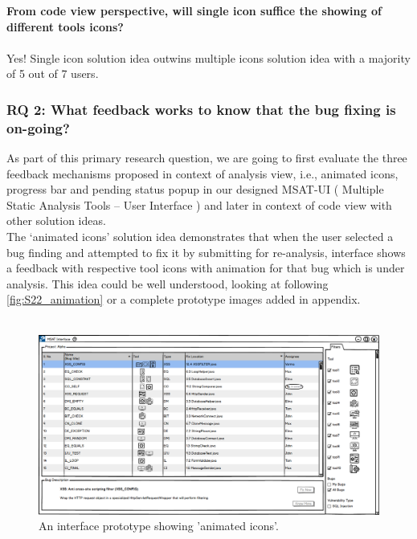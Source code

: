 \begin{myboxi}{{\textbf{From code view perspective, will single icon suffice the showing of different tools icons?}}}
\\ \\	Yes! Single icon solution idea outwins multiple icons solution idea with a majority of 5 out of 7 users. 
\end{myboxi}


\subsubsection{RQ 2: What feedback works to know that the bug fixing is on-going?}

As part of this primary research question, we are going to first evaluate the three feedback mechanisms proposed in context of analysis view, i.e., animated icons, progress bar and pending status popup in our designed MSAT-UI ( Multiple Static Analysis Tools – User Interface ) and later in context of code view with other solution ideas. \\

The ‘animated icons’ solution idea demonstrates that when the user selected a bug finding and attempted to fix it by submitting for re-analysis, interface shows a feedback with respective tool icons with animation for that bug which is under analysis. This idea could be well understood, looking at following \autoref{fig:S22_animation} or a complete prototype images added in appendix.  \\ \\


\begin{figure}[hbt!]
	\centering
	\includegraphics[width=\linewidth]{figures/solution_ideas_snaps/S22_animation}
	\caption{An interface prototype showing 'animated icons'.}
	\label{fig:S22_animation}
\end{figure}


